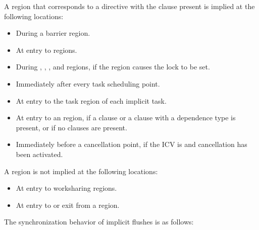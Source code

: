 A  region that corresponds to a  directive with the
 clause present is implied at the following locations:

\begin{itemize}
\item During a barrier region.
\item At entry to  regions.
\item During , ,
    , and  regions, if
    the region causes the lock to be set.
\item Immediately after every task scheduling point.
\item At entry to the task region of each implicit task.
\item At entry to an  region, if a
     clause or a  clause with a
     dependence type is present, or if no clauses are present.
\item Immediately before a cancellation point, if the  ICV is
     and cancellation has been activated.
\end{itemize}

\begin{note}
A  region is not implied at the following locations:
\begin{itemize}
\item At entry to worksharing regions.

\item At entry to or exit from a  region.
\end{itemize}
\end{note}

The synchronization behavior of implicit flushes is as follows:

